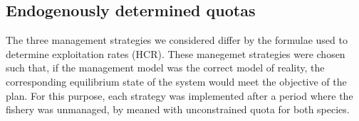 \documentclass[12pt,oneline,a4paper,numbib]{ouparticle}
\numberwithin{equation}{subsection} %
\begin{document}
\subsection{Endogenously determined quotas}
\label{sec2.3}

The three management strategies we considered differ by the formulae used to determine exploitation rates (HCR). These manegemet strategies were chosen such that, if  the  management  model  was  the  correct  model  of  reality,  the corresponding  equilibrium  state  of  the  system  would  meet  the  objective  of  the  plan. For this purpose, each strategy was implemented after a period where the fishery was unmanaged, by meaned with unconstrained quota for both species.



\begin{table}[!h]
\centering
\caption{}
\label{scenarios}
\end{table}
 
\end{document}
